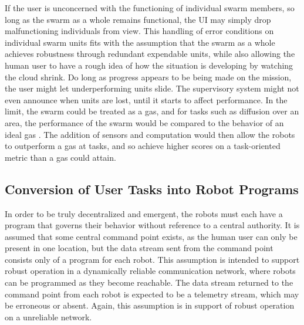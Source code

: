 \documentclass[]{article}
\begin{document}
If the user is unconcerned with the functioning of individual swarm members, so long as the swarm as a whole remains functional, the UI may simply drop malfunctioning individuals from view. 
This handling of error conditions on individual swarm units fits with the assumption that the swarm as a whole achieves robustness through redundant expendable units, while also allowing the human user to have a rough idea of how the situation is developing by watching the cloud shrink. 
Do long as progress appears to be being made on the mission, the user might let underperforming units slide. 
The supervisory system might not even announce when units are lost, until it starts to affect performance.  
In the limit, the swarm could be treated as a gas, and for tasks such as diffusion over an area, the performance of the swarm would be compared to the behavior of an ideal gas \cite{jantz1997kinetics}.
The addition of sensors and computation would then allow the robots to outperform a gas at tasks, and so achieve higher scores on a task-oriented metric than a gas could attain. 
 
\subsection{Conversion of User Tasks into Robot Programs} 

In order to be truly decentralized and emergent, the robots must each have a program that governs their behavior without reference to a central authority. 
It is assumed that some central command point exists, as the human user can only be present in one location, but the data stream sent from the command point consists only of a program for each robot. 
This assumption is intended to support robust operation in a dynamically reliable communication network, where robots can be programmed as they become reachable. 
The data stream returned to the command point from each robot is expected to be a telemetry stream, which may be erroneous or absent. 
Again, this assumption is in support of robust operation on a unreliable network. 
\end{document}

